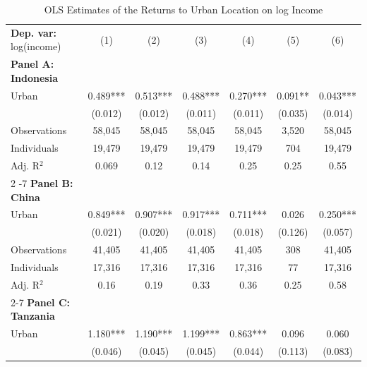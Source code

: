 \begin{table}[htbp] \centering \begin{threeparttable}
 \caption{OLS Estimates of the Returns to Urban Location on log Income} 
 \label{tab:OLS_income_urban_unb} 
\begin{tabular}{l cccccc} \toprule  \textbf{Dep. var:}  log(income) 
                    &\multicolumn{1}{c}{(1)}   &\multicolumn{1}{c}{(2)}   &\multicolumn{1}{c}{(3)}   &\multicolumn{1}{c}{(4)}   &\multicolumn{1}{c}{(5)}   &\multicolumn{1}{c}{(6)}   \\
\textbf{Panel A: Indonesia} \\
Urban               &       0.489***&       0.513***&       0.488***&       0.270***&       0.091** &       0.043***\\
                    &     (0.012)   &     (0.012)   &     (0.011)   &     (0.011)   &     (0.035)   &     (0.014)   \\
\addlinespace
Observations        &      58,045   &      58,045   &      58,045   &      58,045   &       3,520   &      58,045   \\
Individuals         &      19,479   &      19,479   &      19,479   &      19,479   &         704   &      19,479   \\
Adj. R$^{2}$        &       0.069   &        0.12   &        0.14   &        0.25   &        0.25   &        0.55   \\
\cmidrule{2 -7}
\textbf{Panel B: China} \\
Urban               &       0.849***&       0.907***&       0.917***&       0.711***&       0.026   &       0.250***\\
                    &     (0.021)   &     (0.020)   &     (0.018)   &     (0.018)   &     (0.126)   &     (0.057)   \\
\addlinespace
Observations        &      41,405   &      41,405   &      41,405   &      41,405   &         308   &      41,405   \\
Individuals         &      17,316   &      17,316   &      17,316   &      17,316   &          77   &      17,316   \\
Adj. R$^{2}$        &        0.16   &        0.19   &        0.33   &        0.36   &        0.25   &        0.58   \\
\cmidrule{2-7}
\textbf{Panel C: Tanzania} \\
Urban               &       1.180***&       1.190***&       1.199***&       0.863***&       0.096   &       0.060   \\
                    &     (0.046)   &     (0.045)   &     (0.045)   &     (0.044)   &     (0.113)   &     (0.083)   \\

\end{tabular}
\end{threeparttable}
\end{table}
